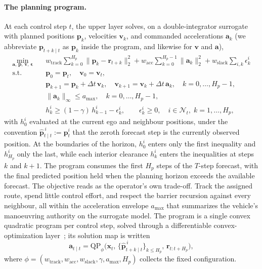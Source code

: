 \documentclass[11pt]{article}
\theoremstyle{plain}
\theoremstyle{definition}
\newcommand{\bx}{\bm{x}}
\begin{document}
\paragraph{The planning program.}
At each control step $t$, the upper layer solves, on a
double-integrator surrogate with planned positions $\bm{p}_k$,
velocities $\bm{v}_k$, and commanded accelerations $\bm{a}_k$ (we
abbreviate $\bm{p}_{t+k \mid t}$ as $\bm{p}_k$ inside the program, and
likewise for $\bm{v}$ and $\bm{a}$),
\begin{equation}
	\label{eq:planning-qp}
	\begin{aligned}
		\min_{\bm{a},\, \bm{p},\, \bm{v},\, \bm{\epsilon}} \quad
		 & w_{\mathrm{track}} \sum_{k=0}^{H_p}
		\| \bm{p}_k - \bm{r}_{t+k} \|_2^2
		+ w_{\mathrm{acc}} \sum_{k=0}^{H_p - 1} \| \bm{a}_k \|_2^2
		+ w_{\mathrm{slack}} \sum_{i,k} \epsilon^{i}_{k}          \\
		\text{s.t.} \quad
		 & \bm{p}_0 = \bm{p}_t, \quad \bm{v}_0 = \bm{v}_t,        \\
		 & \bm{p}_{k+1} = \bm{p}_k + \Delta t\, \bm{v}_k, \quad
		\bm{v}_{k+1} = \bm{v}_k + \Delta t\, \bm{a}_k,
		\quad k = 0, \dots, H_p - 1,                              \\
		 & \| \bm{a}_k \|_{\infty} \leq a_{\max},
		\quad k = 0, \dots, H_p - 1,                              \\
		 & h^{i}_{k} \geq (1 - \gamma)\, h^{i}_{k-1}
		- \epsilon^{i}_{k}, \qquad
		\epsilon^{i}_{k} \geq 0,
		\quad i \in \mathcal{N}_t,\; k = 1, \dots, H_p,
	\end{aligned}
\end{equation}
with $h^i_0$ evaluated at the current ego and neighbour positions,
under the convention $\hat{\bm{p}}^{\,i}_{t \mid t} := \bm{p}^i_t$
that the zeroth forecast step is the currently observed position. At
the boundaries of the horizon, $h^i_0$ enters only the first
inequality and $h^i_{H_p}$ only the last, while each interior
clearance $h^i_k$ enters the inequalities at steps $k$ and $k+1$. The program consumes the first $H_p$ steps of the $T$-step
forecast, with the final predicted position held when the planning
horizon exceeds the available forecast. The objective reads as the
operator's own trade-off. Track the assigned route, spend little
control effort, and respect the barrier recursion against every
neighbour, all within the acceleration envelope $a_{\max}$ that
summarizes the vehicle's manoeuvring authority on the surrogate model.
The program is a single convex quadratic program per control step,
solved through a differentiable convex-optimization
layer~\citep{mandi2024decisionfocused}; its solution map is written
\begin{equation}
	\label{eq:solution-map}
	\bm{a}_{t \mid t}
	= \mathrm{QP}_{\phi}\big( \bx_t,\,
	\{\hat{\bm{p}}^{\,i}_{t+k \mid t}\}_{k \leq H_p},\,
	\bm{r}_{t:t+H_p} \big),
\end{equation}
where $\phi = (w_{\mathrm{track}}, w_{\mathrm{acc}},
	w_{\mathrm{slack}}, \gamma, a_{\max}, H_p)$ collects the fixed
configuration.
 
\end{document}
